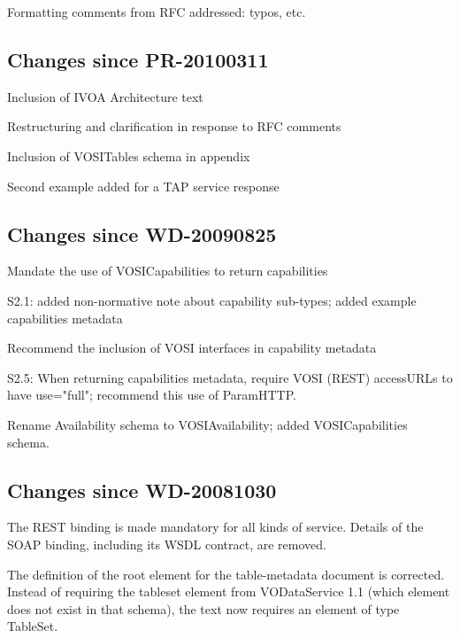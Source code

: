 \documentclass[11pt,letter]{ivoa}
\begin{document}
Formatting comments from RFC addressed: typos, etc.

\subsection{Changes since PR-20100311}

Inclusion of IVOA Architecture text

Restructuring and clarification in response to RFC comments

Inclusion of VOSITables schema in appendix

Second example added for a TAP service response

\subsection{Changes since WD-20090825}

Mandate the use of VOSICapabilities to return capabilities

S2.1: added non-normative note about capability sub-types; added example capabilities metadata

Recommend the inclusion of VOSI interfaces in capability metadata

S2.5: When returning capabilities metadata, require VOSI (REST) accessURLs to have use="full"; recommend this use of ParamHTTP.

Rename Availability schema to VOSIAvailability; added VOSICapabilities schema.

\subsection{Changes since WD-20081030}

The REST binding is made mandatory for all kinds of service. Details of the SOAP binding, including its WSDL contract, are removed.

The definition of the root element for the table-metadata document is corrected. Instead of requiring the tableset element from VODataService 1.1 (which element does not exist in that schema), the text now requires an element of type TableSet. 



\end{document}
